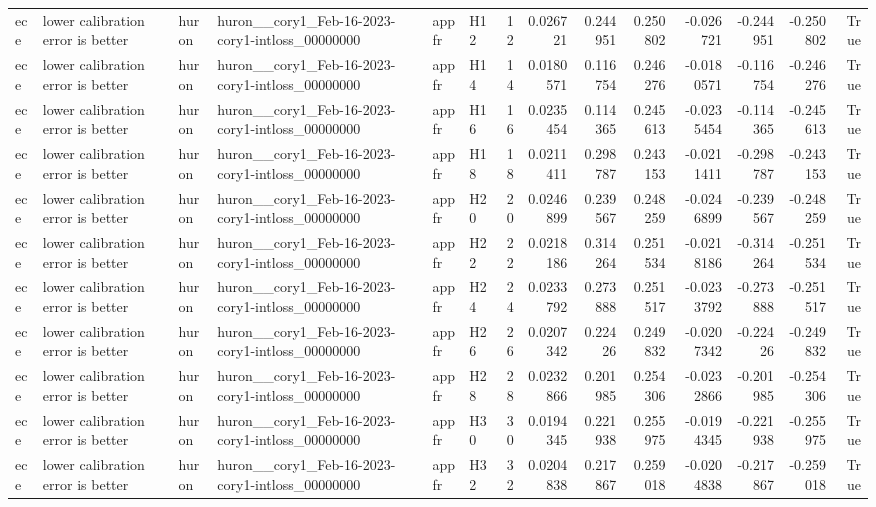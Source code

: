 \begin{longtable}{llllllrrrrrrrr}
ece & lower calibration error is better & huron & huron\_\_cory1\_Feb-16-2023-cory1-intloss\_00000000 & appfr & H12 & 12 & 0.026721 & 0.244951 & 0.250802 & -0.026721 & -0.244951 & -0.250802 & True \\
ece & lower calibration error is better & huron & huron\_\_cory1\_Feb-16-2023-cory1-intloss\_00000000 & appfr & H14 & 14 & 0.0180571 & 0.116754 & 0.246276 & -0.0180571 & -0.116754 & -0.246276 & True \\
ece & lower calibration error is better & huron & huron\_\_cory1\_Feb-16-2023-cory1-intloss\_00000000 & appfr & H16 & 16 & 0.0235454 & 0.114365 & 0.245613 & -0.0235454 & -0.114365 & -0.245613 & True \\
ece & lower calibration error is better & huron & huron\_\_cory1\_Feb-16-2023-cory1-intloss\_00000000 & appfr & H18 & 18 & 0.0211411 & 0.298787 & 0.243153 & -0.0211411 & -0.298787 & -0.243153 & True \\
ece & lower calibration error is better & huron & huron\_\_cory1\_Feb-16-2023-cory1-intloss\_00000000 & appfr & H20 & 20 & 0.0246899 & 0.239567 & 0.248259 & -0.0246899 & -0.239567 & -0.248259 & True \\
ece & lower calibration error is better & huron & huron\_\_cory1\_Feb-16-2023-cory1-intloss\_00000000 & appfr & H22 & 22 & 0.0218186 & 0.314264 & 0.251534 & -0.0218186 & -0.314264 & -0.251534 & True \\
ece & lower calibration error is better & huron & huron\_\_cory1\_Feb-16-2023-cory1-intloss\_00000000 & appfr & H24 & 24 & 0.0233792 & 0.273888 & 0.251517 & -0.0233792 & -0.273888 & -0.251517 & True \\
ece & lower calibration error is better & huron & huron\_\_cory1\_Feb-16-2023-cory1-intloss\_00000000 & appfr & H26 & 26 & 0.0207342 & 0.22426 & 0.249832 & -0.0207342 & -0.22426 & -0.249832 & True \\
ece & lower calibration error is better & huron & huron\_\_cory1\_Feb-16-2023-cory1-intloss\_00000000 & appfr & H28 & 28 & 0.0232866 & 0.201985 & 0.254306 & -0.0232866 & -0.201985 & -0.254306 & True \\
ece & lower calibration error is better & huron & huron\_\_cory1\_Feb-16-2023-cory1-intloss\_00000000 & appfr & H30 & 30 & 0.0194345 & 0.221938 & 0.255975 & -0.0194345 & -0.221938 & -0.255975 & True \\
ece & lower calibration error is better & huron & huron\_\_cory1\_Feb-16-2023-cory1-intloss\_00000000 & appfr & H32 & 32 & 0.0204838 & 0.217867 & 0.259018 & -0.0204838 & -0.217867 & -0.259018 & True \\

\end{longtable}
